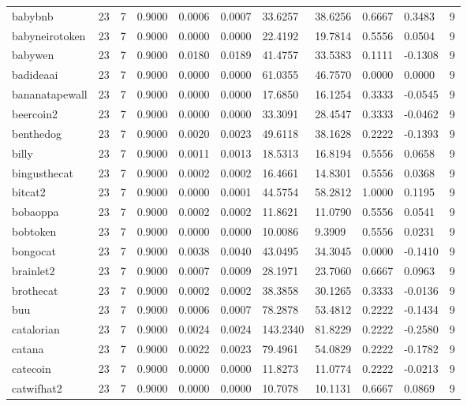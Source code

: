 \begin{table}[htbp]
\begin{tabular}{lllllllllll}
babybnb & 23 & 7 & 0.9000 & 0.0006 & 0.0007 & 33.6257 & 38.6256 & 0.6667 & 0.3483 & 9 \\
babyneirotoken & 23 & 7 & 0.9000 & 0.0000 & 0.0000 & 22.4192 & 19.7814 & 0.5556 & 0.0504 & 9 \\
babywen & 23 & 7 & 0.9000 & 0.0180 & 0.0189 & 41.4757 & 33.5383 & 0.1111 & -0.1308 & 9 \\
badideaai & 23 & 7 & 0.9000 & 0.0000 & 0.0000 & 61.0355 & 46.7570 & 0.0000 & 0.0000 & 9 \\
bananatapewall & 23 & 7 & 0.9000 & 0.0000 & 0.0000 & 17.6850 & 16.1254 & 0.3333 & -0.0545 & 9 \\
beercoin2 & 23 & 7 & 0.9000 & 0.0000 & 0.0000 & 33.3091 & 28.4547 & 0.3333 & -0.0462 & 9 \\
benthedog & 23 & 7 & 0.9000 & 0.0020 & 0.0023 & 49.6118 & 38.1628 & 0.2222 & -0.1393 & 9 \\
billy & 23 & 7 & 0.9000 & 0.0011 & 0.0013 & 18.5313 & 16.8194 & 0.5556 & 0.0658 & 9 \\
bingusthecat & 23 & 7 & 0.9000 & 0.0002 & 0.0002 & 16.4661 & 14.8301 & 0.5556 & 0.0368 & 9 \\
bitcat2 & 23 & 7 & 0.9000 & 0.0000 & 0.0001 & 44.5754 & 58.2812 & 1.0000 & 0.1195 & 9 \\
bobaoppa & 23 & 7 & 0.9000 & 0.0002 & 0.0002 & 11.8621 & 11.0790 & 0.5556 & 0.0541 & 9 \\
bobtoken & 23 & 7 & 0.9000 & 0.0000 & 0.0000 & 10.0086 & 9.3909 & 0.5556 & 0.0231 & 9 \\
bongocat & 23 & 7 & 0.9000 & 0.0038 & 0.0040 & 43.0495 & 34.3045 & 0.0000 & -0.1410 & 9 \\
brainlet2 & 23 & 7 & 0.9000 & 0.0007 & 0.0009 & 28.1971 & 23.7060 & 0.6667 & 0.0963 & 9 \\
brothecat & 23 & 7 & 0.9000 & 0.0002 & 0.0002 & 38.3858 & 30.1265 & 0.3333 & -0.0136 & 9 \\
buu & 23 & 7 & 0.9000 & 0.0006 & 0.0007 & 78.2878 & 53.4812 & 0.2222 & -0.1434 & 9 \\
catalorian & 23 & 7 & 0.9000 & 0.0024 & 0.0024 & 143.2340 & 81.8229 & 0.2222 & -0.2580 & 9 \\
catana & 23 & 7 & 0.9000 & 0.0022 & 0.0023 & 79.4961 & 54.0829 & 0.2222 & -0.1782 & 9 \\
catecoin & 23 & 7 & 0.9000 & 0.0000 & 0.0000 & 11.8273 & 11.0774 & 0.2222 & -0.0213 & 9 \\
catwifhat2 & 23 & 7 & 0.9000 & 0.0000 & 0.0000 & 10.7078 & 10.1131 & 0.6667 & 0.0869 & 9 \\

\end{tabular}
\end{table}
